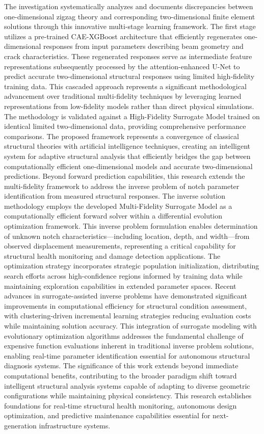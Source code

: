 \documentclass[12pt,a4paper]{report}
\begin{document}
The investigation systematically analyzes and documents discrepancies between one-dimensional zigzag theory and corresponding two-dimensional finite element solutions through this innovative multi-stage learning framework. The first stage utilizes a pre-trained CAE-XGBoost architecture that efficiently regenerates one-dimensional responses from input parameters describing beam geometry and crack characteristics. These regenerated responses serve as intermediate feature representations subsequently processed by the attention-enhanced U-Net to predict accurate two-dimensional structural responses using limited high-fidelity training data.
This cascaded approach represents a significant methodological advancement over traditional multi-fidelity techniques by leveraging learned representations from low-fidelity models rather than direct physical simulations. The methodology is validated against a High-Fidelity Surrogate Model trained on identical limited two-dimensional data, providing comprehensive performance comparisons. The proposed framework represents a convergence of classical structural theories with artificial intelligence techniques, creating an intelligent system for adaptive structural analysis that efficiently bridges the gap between computationally efficient one-dimensional models and accurate two-dimensional predictions.
Beyond forward prediction capabilities, this research extends the multi-fidelity framework to address the inverse problem of notch parameter identification from measured structural responses. The inverse solution methodology employs the developed Multi-Fidelity Surrogate Model as a computationally efficient forward solver within a differential evolution optimization framework. This inverse problem formulation enables determination of unknown notch characteristics—including location, depth, and width—from observed displacement measurements, representing a critical capability for structural health monitoring and damage detection applications. The optimization strategy incorporates strategic population initialization, distributing search efforts across high-confidence regions informed by training data while maintaining exploration capabilities in extended parameter spaces. Recent advances in surrogate-assisted inverse problems have demonstrated significant improvements in computational efficiency for structural condition assessment, with clustering-driven incremental learning strategies reducing evaluation costs while maintaining solution accuracy. This integration of surrogate modeling with evolutionary optimization algorithms addresses the fundamental challenge of expensive function evaluations inherent in traditional inverse problem solutions, enabling real-time parameter identification essential for autonomous structural diagnosis systems.
The significance of this work extends beyond immediate computational benefits, contributing to the broader paradigm shift toward intelligent structural analysis systems capable of adapting to diverse geometric configurations while maintaining physical consistency. This research establishes foundations for real-time structural health monitoring, autonomous design optimization, and predictive maintenance capabilities essential for next-generation infrastructure systems.
\end{document}
